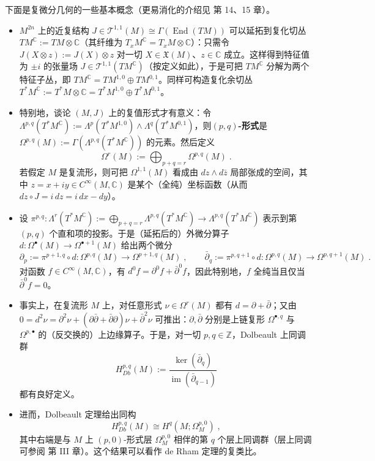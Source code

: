 \begin{Rem}\label{rem:7.2}
下面是复微分几何的一些基本概念（更易消化的介绍见 \cite{Sil12} 第 14、15 章）。
\begin{itemize}
  \item $M^{2n}$ 上的近复结构 $J\in\mathcal T^{1,1}(M)\cong\Gamma(\operatorname{End}(TM))$ 可以延拓到复化切丛 $TM^{\mathbb C}:=TM\otimes\mathbb C$（其纤维为 $T_xM^{\mathbb C}=T_xM\otimes\mathbb C$）：只需令 $J(X\otimes z):=J(X)\otimes z$ 对一切 $X\in\mathfrak X(M)$、$z\in\mathbb C$ 成立。这样得到特征值为 $\pm i$ 的张量场 $J\in\mathcal T^{1,1}(TM^{\mathbb C})$（按定义如此），于是可把 $TM^{\mathbb C}$ 分解为两个特征子丛，即 $TM^{\mathbb C}=TM^{1,0}\oplus TM^{0,1}$。同样可构造复化余切丛 $T^*M^{\mathbb C}:=T^*M\otimes\mathbb C=T^*M^{1,0}\oplus T^*M^{0,1}$。
  \item 特别地，谈论 $(M,J)$ 上的复值形式才有意义：令 $\Lambda^{p,q}(T^*M^{\mathbb C}):=\Lambda^p(T^*M^{1,0})\wedge\Lambda^q(T^*M^{0,1})$，则\textbf{$(p,q)$-形式}是 $\Omega^{p,q}(M):=\Gamma(\Lambda^{p,q}(T^*M^{\mathbb C}))$ 的元素。然后定义
  \[
  \Omega^r(M):=\bigoplus_{p+q=r}\Omega^{p,q}(M)\;.
  \]
  若假定 $M$ 是复流形，则可把 $\Omega^{1,1}(M)$ 看成由 $dz\wedge d\bar z$ 局部张成的空间，其中 $z=x+iy\in C^\infty(M,\mathbb C)$ 是某个（全纯）坐标函数（从而 $dz\circ J=i\,dz=i\,dx-dy$）。
  \item 设 $\pi^{p,q}:\Lambda^r(T^*M^{\mathbb C}):=\bigoplus_{p+q=r}\Lambda^{p,q}(T^*M^{\mathbb C})\to\Lambda^{p,q}(T^*M^{\mathbb C})$ 表示到第 $(p,q)$ 个直和项的投影。于是（延拓后的）外微分算子 $d:\Omega^\bullet(M)\to\Omega^{\bullet+1}(M)$ 给出两个微分
  \[
  \partial_p:=\pi^{p+1,q}\circ d:\Omega^{p,q}(M)\to\Omega^{p+1,q}(M)\;,\qquad
  \bar\partial_q:=\pi^{p,q+1}\circ d:\Omega^{p,q}(M)\to\Omega^{p,q+1}(M)\;.
  \]
  对函数 $f\in C^\infty(M,\mathbb C)$，有 $d^0f=\partial^0f+\bar\partial^0f$，因此特别地，$f$ 全纯当且仅当 $\bar\partial^0f=0$。
  \item 事实上，在复流形 $M$ 上，对任意形式 $\nu\in\Omega^r(M)$ 都有 $d=\partial+\bar\partial$；又由 $0=d^2\nu=\partial^2\nu+(\partial\bar\partial+\bar\partial\partial)\nu+\bar\partial^2\nu$ 可推出：$\partial,\bar\partial$ 分别是上链复形 $\Omega^{\bullet,q}$ 与 $\Omega^{p,\bullet}$ 的（反交换的）上边缘算子。于是，对一切 $p,q\in\mathbb Z$，Dolbeault 上同调群
  \begin{equation}\label{eq:7.101}
  H^{p,q}_{Db}(M):=\frac{\ker(\bar\partial_q)}{\operatorname{im}(\bar\partial_{q-1})}
  \end{equation}
  都有良好定义。
  \item 进而，Dolbeault 定理给出同构
  \begin{equation}\label{eq:7.102}
  H^{p,q}_{Db}(M)\cong H^q(M;\Omega^{p,0}_M)\;,
  \end{equation}
  其中右端是与 $M$ 上 $(p,0)$-形式层 $\Omega^{p,0}_M$ 相伴的第 $q$ 个层上同调群（层上同调可参阅 \cite{Har77} 第 III 章）。这个结果可以看作 de Rham 定理的复类比。
\end{itemize}
\end{Rem}

